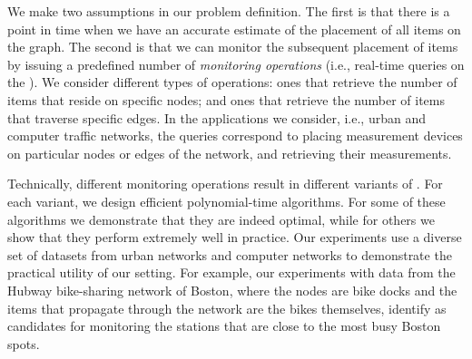 We make two assumptions in our problem definition.
The first is that there is a point in time when we have an accurate
estimate of the placement of all items on the graph.
The second is that we can monitor the subsequent placement
of items by issuing a predefined number of {\it monitoring operations} 
(i.e.,  real-time queries on the {\markovchain}).
We consider different types of operations:
ones that retrieve the number of items that reside on specific nodes;
and ones that retrieve the number of items that traverse specific edges. 
In the applications we consider, i.e., urban and computer traffic networks,
the queries correspond to placing measurement devices on particular 
nodes or edges of the network, and retrieving their measurements. 

Technically, different monitoring operations result in different
variants of  {\mcproblem}.
For each variant, we design efficient polynomial-time algorithms. 
For some of these algorithms we demonstrate that they are indeed
optimal, while for others we show that they perform extremely well in practice. 
Our experiments use a diverse set of datasets from urban networks and computer
networks to demonstrate the practical utility of our setting. 
For example, our experiments with data from the Hubway bike-sharing 
network of Boston, where the nodes are bike docks and the items that propagate
through the network are the bikes themselves, identify as candidates for monitoring
the stations that are close to the most busy Boston spots.


